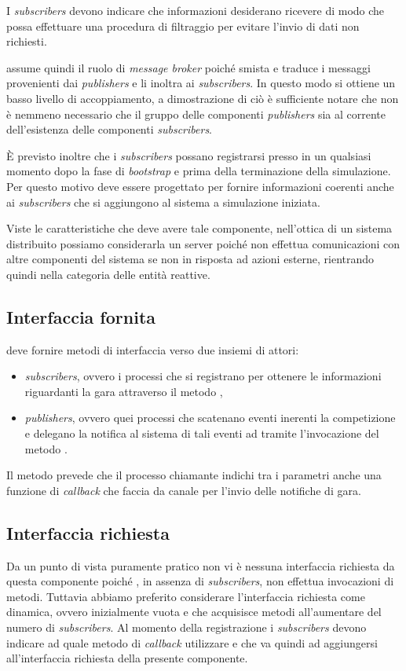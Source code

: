 I \textit{subscribers} devono indicare che informazioni desiderano ricevere di modo che \evdisp{} possa effettuare una procedura di filtraggio per evitare l'invio di dati non richiesti.

\evdisp{} assume quindi il ruolo di \textit{message broker} poiché smista e traduce i messaggi provenienti dai \textit{publishers} e li inoltra ai \textit{subscribers}. In questo modo si ottiene un basso livello di accoppiamento, a dimostrazione di ciò è sufficiente notare che non è nemmeno necessario che il gruppo delle componenti \textit{publishers} sia al corrente dell'esistenza delle componenti \textit{subscribers}.

\`E previsto inoltre che i \textit{subscribers} possano registrarsi presso \evdisp{} in un qualsiasi momento dopo la fase di \textit{bootstrap} e prima della terminazione della simulazione. Per questo motivo \evdisp{} deve essere progettato per fornire informazioni coerenti anche ai \textit{subscribers} che si aggiungono al sistema a simulazione iniziata.

Viste le caratteristiche che deve avere tale componente, nell'ottica di un sistema distribuito possiamo considerarla un server poiché non effettua comunicazioni con altre componenti del sistema se non in risposta ad azioni esterne, rientrando quindi nella categoria delle entità reattive.

\subsection*{Interfaccia fornita}
\evdisp{} deve fornire metodi di interfaccia verso due insiemi di attori:
\begin{itemize}
\item \textit{subscribers}, ovvero i processi che si registrano per ottenere le informazioni riguardanti la gara attraverso il metodo ,
\item \textit{publishers}, ovvero quei processi che scatenano eventi inerenti la competizione e delegano la notifica al sistema di tali eventi ad \evdisp{} tramite l'invocazione del metodo .
\end{itemize}
Il metodo  prevede che il processo chiamante indichi tra i parametri anche una funzione di \textit{callback} che faccia da canale per l'invio delle notifiche di gara.

\subsection*{Interfaccia richiesta}
Da un punto di vista puramente pratico non vi è nessuna interfaccia richiesta da questa componente poiché \evdisp{}, in assenza di \textit{subscribers}, non effettua invocazioni di metodi. Tuttavia abbiamo preferito considerare l'interfaccia richiesta come dinamica, ovvero inizialmente vuota e che acquisisce metodi all'aumentare del numero di \textit{subscribers}. Al momento della registrazione i \textit{subscribers} devono indicare ad \evdisp{} quale metodo di \textit{callback} utilizzare e che va quindi ad aggiungersi all'interfaccia richiesta della presente componente.


